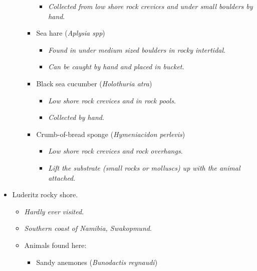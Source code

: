 \documentclass[
  letterpaper,
  DIV=11,
  numbers=noendperiod]{scrreprt}
\providecommand{\tightlist}{%
  \setlength{\itemsep}{0pt}\setlength{\parskip}{0pt}}\usepackage{longtable,booktabs,array}
\begin{document}
\begin{itemize}
\begin{itemize}
\begin{itemize}
      \begin{itemize}
      \tightlist
      \item
        \emph{Collected from low shore rock crevices and under small
        boulders by hand}.
      \end{itemize}
    \item
      Sea hare (\emph{Aplysia spp})

      \begin{itemize}
      \tightlist
      \item
        \emph{Found in under medium sized boulders in rocky intertidal}.
      \item
        \emph{Can be caught by hand and placed in bucket}.
      \end{itemize}
    \item
      Black sea cucumber (\emph{Holothuria atra})

      \begin{itemize}
      \tightlist
      \item
        \emph{Low shore rock crevices and in rock pools}.
      \item
        \emph{Collected by hand}.
      \end{itemize}
    \item
      Crumb-of-bread sponge (\emph{Hymeniacidon perlevis})

      \begin{itemize}
      \tightlist
      \item
        \emph{Low shore rock crevices and rock overhangs}.
      \item
        \emph{Lift the substrate (small rocks or molluscs) up with the
        animal attached}.
      \end{itemize}
    \end{itemize}
  \end{itemize}
\item
  Luderitz rocky shore.

  \begin{itemize}
  \tightlist
  \item
    \emph{Hardly ever visited}.
  \item
    \emph{Southern coast of Namibia, Swakopmund}.
  \item
    Animals found here:

    \begin{itemize}
    \tightlist
    \item
      Sandy anemones (\emph{Bunodactis reynaudi})


\end{itemize}
\end{itemize}
\end{itemize}
\end{document}
